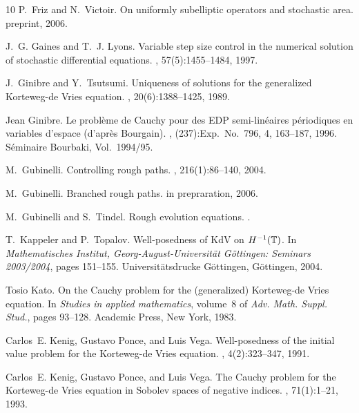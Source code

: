 \documentclass[a4paper,11pt,reqno]{article}
\begin{document}
\begin{thebibliography}{10}
P.~Friz and N.~Victoir.
\newblock On uniformly subelliptic operators and stochastic area.
\newblock preprint, 2006.

J.~G. Gaines and T.~J. Lyons.
\newblock Variable step size control in the numerical solution of stochastic
  differential equations.
, 57(5):1455--1484, 1997.

J.~Ginibre and Y.~Tsutsumi.
\newblock Uniqueness of solutions for the generalized {K}orteweg-de {V}ries
  equation.
, 20(6):1388--1425, 1989.

Jean Ginibre.
\newblock Le probl\`eme de {C}auchy pour des {EDP} semi-lin\'eaires
  p\'eriodiques en variables d'espace (d'apr\`es {B}ourgain).
, (237):Exp.\ No.\ 796, 4, 163--187, 1996.
\newblock S\'eminaire Bourbaki, Vol.\ 1994/95.

M.~Gubinelli.
\newblock Controlling rough paths.
, 216(1):86--140, 2004.

M.~Gubinelli.
\newblock Branched rough paths.
\newblock in prepraration, 2006.

M.~Gubinelli and S.~Tindel.
\newblock Rough evolution equations.
.

T.~Kappeler and P.~Topalov.
\newblock Well-posedness of {K}d{V} on {$H\sp {-1}(\Bbb T)$}.
\newblock In {\em Mathematisches Institut, Georg-August-Universit\"at
  G\"ottingen: Seminars 2003/2004}, pages 151--155. Universit\"atsdrucke
  G\"ottingen, G\"ottingen, 2004.

Tosio Kato.
\newblock On the {C}auchy problem for the (generalized) {K}orteweg-de {V}ries
  equation.
\newblock In {\em Studies in applied mathematics}, volume~8 of {\em Adv. Math.
  Suppl. Stud.}, pages 93--128. Academic Press, New York, 1983.

Carlos~E. Kenig, Gustavo Ponce, and Luis Vega.
\newblock Well-posedness of the initial value problem for the {K}orteweg-de
  {V}ries equation.
, 4(2):323--347, 1991.

Carlos~E. Kenig, Gustavo Ponce, and Luis Vega.
\newblock The {C}auchy problem for the {K}orteweg-de {V}ries equation in
  {S}obolev spaces of negative indices.
, 71(1):1--21, 1993.


\end{thebibliography}
\end{document}
